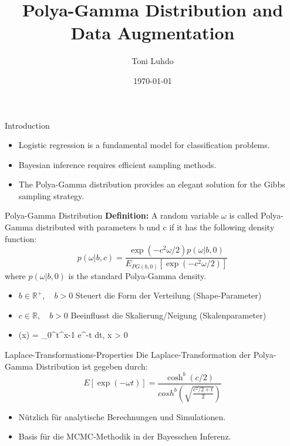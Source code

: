 \documentclass{beamer}
\title{Polya-Gamma Distribution and Data Augmentation}
\author{Toni Luhdo}
\date{\today}
\begin{document}
	
	\frame{\titlepage}
	
	\begin{frame}{Introduction}
		\begin{itemize}
			\item Logistic regression is a fundamental model for classification problems.
			\item Bayesian inference requires efficient sampling methods.
			\item The Polya-Gamma distribution provides an elegant solution for the Gibbs sampling strategy.
		\end{itemize}
	\end{frame}
	
	\begin{frame}{Polya-Gamma Distribution}
		\textbf{Definition:} A random variable $\omega$ is called Polya-Gamma distributed with parameters b und c if it has the following density function:
		\begin{equation}
			p(\omega | b, c) = \frac{\exp(-c^2 \omega /2) p(\omega | b, 0)}{E_{PG(b,0)}[\exp(-c^2 \omega /2)]}
		\end{equation}
		where $p(\omega | b, 0)$ is the standard Polya-Gamma density.
		\begin{itemize}
			\item $b \in \mathbb{R}^{+}, \quad b > 0$ Steuert die Form der Verteilung (Shape-Parameter)
			\item $c \in \mathbb{R}, \quad b > 0$ Beeinflusst die Skalierung/Neigung (Skalenparameter)
			\item  \Gamma(x) = \int_0^\infty t^{x-1} e^{-t} dt, \quad {} x > 0
		\end{itemize}
	\end{frame}
	
	\begin{frame}{Laplace-Transformations-Properties}
		Die Laplace-Transformation der Polya-Gamma Distribution ist gegeben durch:
		\begin{equation}
			E[\exp(-\omega t)] =\frac{ \cosh^{b}(c/2)}{cosh^{b}(\sqrt{\frac{c^2/2+t}{2}})}
		\end{equation}
		\begin{itemize}
			\item Nützlich für analytische Berechnungen und Simulationen.
			\item Basis für die MCMC-Methodik in der Bayesschen Inferenz.
		\end{itemize}
	\end{frame}
\end{document}
